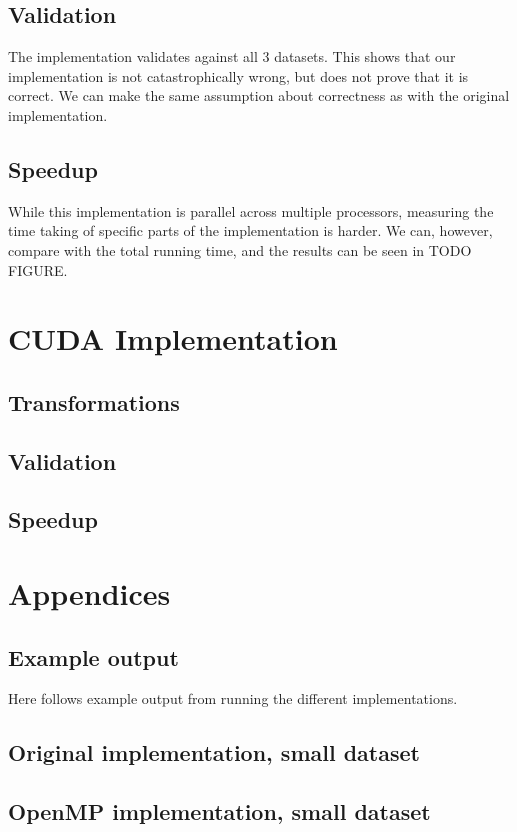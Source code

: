 \documentclass[11pt]{article}
\begin{document}
\subsection{Validation}
The implementation validates against all 3 datasets. This shows that our
implementation is not catastrophically wrong, but does not prove that it is
correct. We can make the same assumption about correctness as with the 
original implementation.

\subsection{Speedup}
While this implementation is parallel across multiple processors, measuring the
time taking of specific parts of the implementation is harder. We can, however, 
compare with the total running time, and the results can be seen in TODO FIGURE.



\section{CUDA Implementation}

\subsection{Transformations}
\subsection{Validation}
\subsection{Speedup}

\newpage
\section{Appendices}
\subsection{Example output}
Here follows example output from running the different implementations.

\subsection{Original implementation, small dataset}

\subsection{OpenMP implementation, small dataset}

\end{document}

